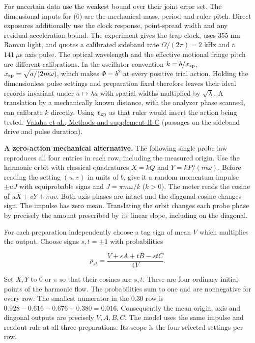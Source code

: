 \documentclass[11pt,a4paper]{article}
\begin{document}
For uncertain data use the weakest bound over their joint error set. The
dimensional inputs for (6) are the mechanical mass, period and ruler
pitch. Direct exposures additionally use the clock response,
point-spread width and any residual acceleration bound. The experiment
gives the trap clock, uses 355 nm Raman light, and quotes a calibrated
sideband rate \(\Omega/(2\pi)=2\) kHz and a \(141\ \mu\)s axis pulse.
The optical wavelength and the effective motional fringe pitch are
different calibrations. In the oscillator convention \(k=b/x_{\rm zp}\),
\(x_{\rm zp}=\sqrt{a/(2m\omega)}\), which makes \(\Phi=b^2\) at every
positive trial action. Holding the dimensionless pulse settings and
preparation fixed therefore leaves their ideal records invariant under
\(a\mapsto\lambda a\) with spatial widths multiplied by
\(\sqrt\lambda\). A translation by a mechanically known distance, with
the analyzer phase scanned, can calibrate \(k\) directly. Using
\(x_{\rm zp}\) as that ruler would insert the action being tested.
\href{https://arxiv.org/pdf/2412.04865}{Valahu et al., Methods and
supplement II C} (passages on the sideband drive and pulse duration).

\textbf{A zero-action mechanical alternative.} The following single
probe law reproduces all four entries in each row, including the
measured origin. Use the harmonic orbit with classical quadratures
\(X=kQ\) and \(Y=kP/(m\omega)\). Before reading the setting \((u,v)\) in
units of \(b\), give it a random momentum impulse \(\pm uJ\) with
equiprobable signs and \(J=\pi m\omega/k\) (\(k>0\)). The meter reads
the cosine of \(uX+vY\pm\pi uv\). Both axis phases are intact and the
diagonal cosine changes sign. The impulse has zero mean. Translating the
orbit changes each probe phase by precisely the amount prescribed by its
linear slope, including on the diagonal.

For each preparation independently choose a tag sign of mean \(V\) which
multiplies the output. Choose signs \(s,t=\pm1\) with probabilities

\[
           p_{st}=\frac{V+sA+tB-stC}{4V}.
\]

Set \(X,Y\) to \(0\) or \(\pi\) so that their cosines are \(s,t\). These
are four ordinary initial points of the harmonic flow. The probabilities
sum to one and are nonnegative for every row. The smallest numerator in
the \(0.30\) row is \(0.928-0.616-0.676+0.380=0.016\). Consequently the
mean origin, axis and diagonal outputs are precisely \(V,A,B,C\). The
model uses the same impulse and readout rule at all three preparations.
Its scope is the four selected settings per row.
\end{document}
